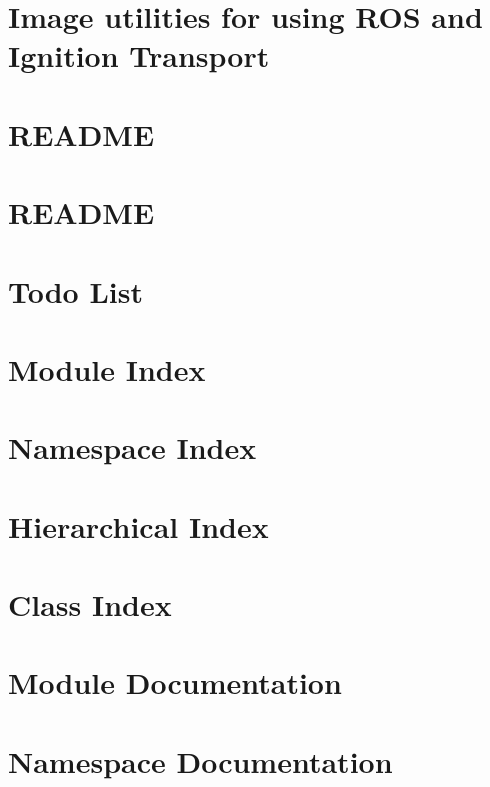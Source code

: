 \let\mypdfximage\pdfximage\def\pdfximage{\immediate\mypdfximage}\documentclass[twoside]{book}
\newcommand{\+}{\discretionary{\mbox{\scriptsize$\hookleftarrow$}}{}{}}
\begin{document}
\chapter{Image utilities for using R\+OS and Ignition Transport}
\label{md_catkin_ws_src_utilities_ros_ign_ros_ign_image_README}

\chapter{R\+E\+A\+D\+ME}
\label{md_catkin_ws_src_utilities_ros_ign_ros_ign_point_cloud_README}

\chapter{R\+E\+A\+D\+ME}
\label{md_catkin_ws_src_utilities_Serial_CAN_Arduino_README}

\chapter{Todo List}
\label{todo}

\chapter{Module Index}

\chapter{Namespace Index}

\chapter{Hierarchical Index}

\chapter{Class Index}

\chapter{Module Documentation}





\chapter{Namespace Documentation}


\end{document}
